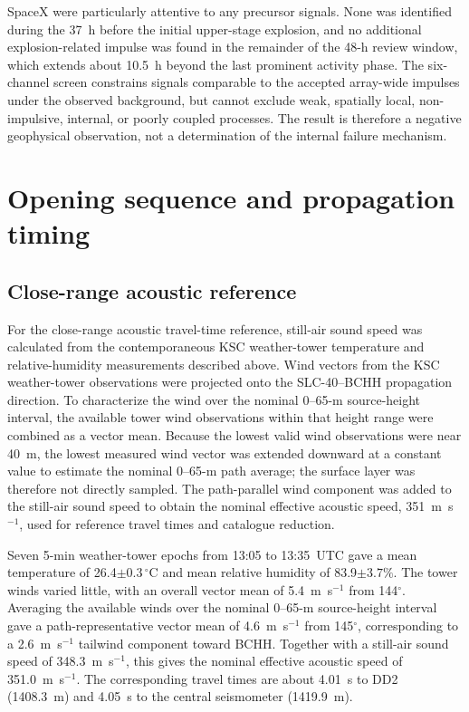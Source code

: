 \documentclass[]{seismica}
\begin{document}
SpaceX were particularly attentive to any precursor signals. None was
identified during the 37~h before the initial upper-stage explosion, and no
additional explosion-related impulse was found in the remainder of the 48-h
review window, which extends about 10.5~h beyond the last prominent activity
phase. The six-channel screen constrains signals comparable to the accepted
array-wide impulses under the observed background, but cannot exclude weak,
spatially local, non-impulsive, internal, or poorly coupled processes. The
result is therefore a negative geophysical observation, not a determination
of the internal failure mechanism.


\section{Opening sequence and propagation timing}
\label{sec:opening_timing}

\subsection{Close-range acoustic reference}

For the close-range acoustic travel-time reference, still-air sound speed was
calculated from the contemporaneous KSC weather-tower temperature and
relative-humidity measurements described above. Wind vectors from the KSC weather-tower observations were
projected onto the SLC-40--BCHH propagation direction. To characterize the wind
over the nominal 0--65-m source-height interval, the available tower wind
observations within that height range were combined as a vector mean. Because
the lowest valid wind observations were near 40~m, the lowest measured wind
vector was extended downward at a constant value to estimate the nominal
0--65-m path average; the surface layer was therefore not directly sampled.
The path-parallel wind component was added to the still-air sound speed to
obtain the nominal effective acoustic speed, 351~m~s$^{-1}$, used for
reference travel times and catalogue reduction.

Seven 5-min weather-tower epochs from 13:05 to 13:35~UTC gave a mean
temperature of 26.4$\pm0.3\,^{\circ}$C and mean relative humidity of
83.9$\pm3.7\%$. The tower winds varied little, with an overall vector mean of
5.4~m~s$^{-1}$ from 144$^\circ$. Averaging the available winds over the
nominal 0--65-m source-height interval gave a path-representative vector mean
of 4.6~m~s$^{-1}$ from 145$^\circ$, corresponding to a 2.6~m~s$^{-1}$
tailwind component toward BCHH. Together with a still-air sound speed of
348.3~m~s$^{-1}$, this gives the nominal effective acoustic speed of
351.0~m~s$^{-1}$. The corresponding travel times are about 4.01~s to DD2
(1408.3~m) and 4.05~s to the central seismometer (1419.9~m).
\end{document}
